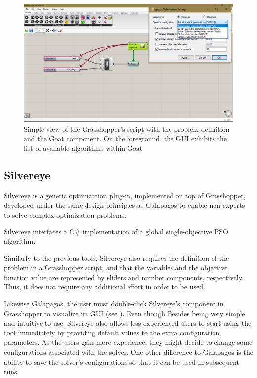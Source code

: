 \begin{figure}
	\centering
	\includegraphics[width=1\textwidth]{Images/Background/Goat/general-view.png}
	\caption[Goat GUI]{Simple view of the Grasshopper's script with the problem definition and the Goat component. On the foreground, the \ac{GUI} exhibits the list of available algorithms within Goat}
	\label{fig:goat}
\end{figure}
	

\subsection{Silvereye}
Silvereye is a generic optimization plug-in, implemented on top of Grasshopper, developed under the same design principles as Galapagos to enable non-experts to solve complex optimization problems. 

Silvereye interfaces a C\# implementation of a global single-objective \ac{PSO} algorithm.

Similarly to the previous tools, Silvereye also requires the definition of the problem in a Grasshopper script, and that the variables and the objective function value are represented by sliders and number components, respectively. Thus, it does not require any additional effort in order to be used.

Likewise Galapagos, the user must double-click Silvereye's component in Grasshopper to visualize its \ac{GUI} (see ). Even though Besides being very simple and intuitive to use, Silvereye also allows less experienced users to start using the tool immediately by providing default values to the extra configuration parameters. As the users gain more experience, they might decide to change some configurations associated with the solver. One other difference to Galapagos is the ability to save the solver's configurations so that it can be used in subsequent runs.

